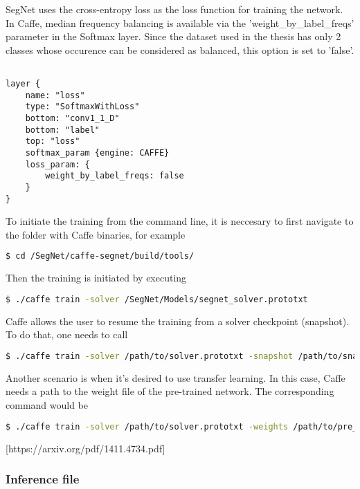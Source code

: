 SegNet uses the cross-entropy loss as the loss function for
training the network. In Caffe, median frequency balancing is available via the 'weight\_by\_label\_freqs' parameter in the Softmax layer. Since the dataset used in the thesis has only 2 classes whose occurence can be considered as balanced, this option is set to 'false'. 

\begin{lstlisting}

layer {
	name: "loss"
	type: "SoftmaxWithLoss"
	bottom: "conv1_1_D"
	bottom: "label"
	top: "loss"
	softmax_param {engine: CAFFE}
	loss_param: {
		weight_by_label_freqs: false	     
	}
}

\end{lstlisting}

To initiate the training from the command line, it is neccesary to first navigate to the folder with Caffe binaries, for example

\begin{lstlisting}[language=bash]
$ cd /SegNet/caffe-segnet/build/tools/
\end{lstlisting}

Then the training is initiated by executing

\begin{lstlisting}[language=bash]
$ ./caffe train -solver /SegNet/Models/segnet_solver.prototxt
\end{lstlisting}

Caffe allows the user to resume the training from a solver checkpoint (snapshot). To do that, one needs to call

\begin{lstlisting}[language=bash]
$ ./caffe train -solver /path/to/solver.prototxt -snapshot /path/to/snapshot_iter_XY.solverstate
\end{lstlisting}

Another scenario is when it's desired to use transfer learning. In this case, Caffe needs a path to the weight file of the pre-trained network. The corresponding command would be

\begin{lstlisting}[language=bash]
$ ./caffe train -solver /path/to/solver.prototxt -weights /path/to/pre_trained_weights.caffemodel
\end{lstlisting}


 [https://arxiv.org/pdf/1411.4734.pdf]

\subsubsection{Inference file}

